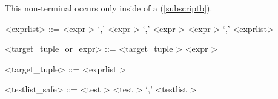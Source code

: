 This non-terminal occurs only inside of a  (\ref{subscriptb}).

\label{exprlistb}

\begin{grammar}
<exprlist> ::= <expr \myref[exprb]> `,'
	\alt <expr \myref[exprb]> `,' <expr \myref[exprb]>
	\alt <expr \myref[exprb]> `,' <exprlist>
\end{grammar}


\label{targetzzztuplezzzorzzzexprb}

\begin{grammar}
<target_tuple_or_expr> ::= <target_tuple \myref[targetzzztupleb]>
	\alt <expr \myref[exprb]>
\end{grammar}


\label{targetzzztupleb}

\begin{grammar}
<target_tuple> ::= <exprlist \myref[exprlistb]>
\end{grammar}


\label{testlistzzzsafeb}

\begin{grammar}
<testlist_safe> ::= <test \myref[testb]>
	\alt <test \myref[testb]> `,' <testlist \myref[testlistb]>
\end{grammar}

